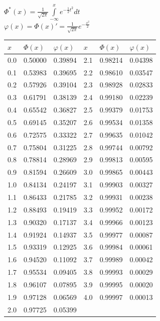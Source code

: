 \documentclass[russian, 12pt, fleqn,x11names]{article}
\begin{document}
\newpage
\noindent
\begin{center}
$\Phi^*(x) = \frac{1}{\sqrt{2\pi} } \displaystyle{\int \limits_{-\infty}^{x}} e^{-\frac{1}{2}t^2} dt$\\
$\varphi(x) = \Phi(x)' = \frac{1}{\sqrt{2\pi} } e^{-\frac{x^2}{2}}$\\

\begin{tabular}[b]{ | l | l |  l || l | l |  l |}
\hline
$x$&$\Phi(x)$&$\varphi(x)$&$x$&$\Phi(x)$&$\varphi(x)$\\
\hline
0.0&0.50000&0.39894&2.1&0.98214&0.04398\\%
0.1&0.53983&0.39695&2.2&0.98610&0.03547\\%
0.2&0.57926&0.39104&2.3&0.98928&0.02833\\%
0.3&0.61791&0.38139&2.4&0.99180&0.02239\\%
0.4&0.65542&0.36827&2.5&0.99379&0.01753\\%
0.5&0.69145&0.35207&2.6&0.99534&0.01358\\%
0.6&0.72575&0.33322&2.7&0.99635&0.01042\\%
0.7&0.75804&0.31225&2.8&0.99744&0.00792\\%
0.8&0.78814&0.28969&2.9&0.99813&0.00595\\%
0.9&0.81594&0.26609&3.0&0.99865&0.00443\\%
1.0&0.84134&0.24197&3.1&0.99903&0.00327\\%
1.1&0.86433&0.21785&3.2&0.99931&0.00238\\%
1.2&0.88493&0.19419&3.3&0.99952&0.00172\\%
1.3&0.90320&0.17137&3.4&0.99966&0.00123\\%
1.4&0.91924&0.14937&3.5&0.99977&0.00087\\%
1.5&0.93319&0.12925&3.6&0.99984&0.00061\\%
1.6&0.94520&0.11092&3.7&0.99989&0.00042\\%
1.7&0.95534&0.09405&3.8&0.99993&0.00029\\%
1.8&0.96107&0.07895&3.9&0.99995&0.00020\\%
1.9&0.97128&0.06569&4.0&0.99997&0.00013\\%
2.0&0.97725&0.05399&     &              &             \\
\hline

\end{tabular}

\end{center}
\end{document}

